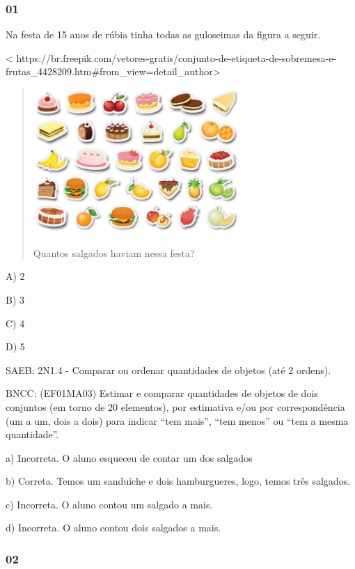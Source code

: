 \subsubsection{01}\label{section-132}

Na festa de 15 anos de rúbia tinha todas as guloseimas da figura a
seguir.

\textless{}
https://br.freepik.com/vetores-gratis/conjunto-de-etiqueta-de-sobremesa-e-frutas\_4428209.htm\#from\_view=detail\_author\textgreater{}

\begin{quote}
\includegraphics[width=3.09935in,height=2.16853in]{media/image151.jpg}

Quantos salgados haviam nessa festa?
\end{quote}

A) 2

B) 3

C) 4

D) 5

SAEB: 2N1.4 - Comparar ou ordenar quantidades de objetos (até 2 ordens).

BNCC: (EF01MA03) Estimar e comparar quantidades de objetos de dois
conjuntos (em torno de 20 elementos), por estimativa e/ou por
correspondência (um a um, dois a dois) para indicar ``tem mais'', ``tem
menos'' ou ``tem a mesma quantidade''.

a) Incorreta. O aluno esqueceu de contar um dos salgados

b) Correta. Temos um sanduíche e dois hamburgueres, logo, temos três
salgados.

c) Incorreta. O aluno contou um salgado a mais.

d) Incorreta. O aluno contou dois salgados a mais.

\subsubsection{02}\label{section-133}

